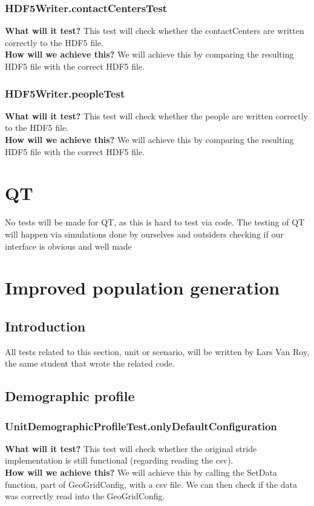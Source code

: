 \documentclass{article}
\begin{document}
\subsubsection{HDF5Writer.contactCentersTest}
\textbf{What will it test?}
This test will check whether the contactCenters are written correctly to the HDF5 file. \\
\newline
\textbf{How will we achieve this?}
We will achieve this by comparing the resulting HDF5 file with the correct HDF5 file.

\subsubsection{HDF5Writer.peopleTest}
\textbf{What will it test?}
This test will check whether the people are written correctly to the HDF5 file. \\
\newline
\textbf{How will we achieve this?}
We will achieve this by comparing the resulting HDF5 file with the correct HDF5 file.
\section{QT}
No tests will be made for QT, as this is hard to test via code. The testing of QT will happen via simulations done by ourselves and outsiders checking if our interface is obvious and well made
\section{Improved population generation}
\subsection{Introduction}
All tests related to this section, unit or scenario, will be written by Lars Van Roy, the same student that wrote the related code.
\subsection{Demographic profile}
\subsubsection{UnitDemographicProfileTest.onlyDefaultConfiguration} 
\textbf{What will it test?} 
This test will check whether the original stride implementation is still functional (regarding reading the csv). \\
\newline
\textbf{How will we achieve this?} 
We will achieve this by calling the SetData function, part of GeoGridConfig, with a csv file. We can then check if the data was correctly read into the GeoGridConfig.
\end{document}
